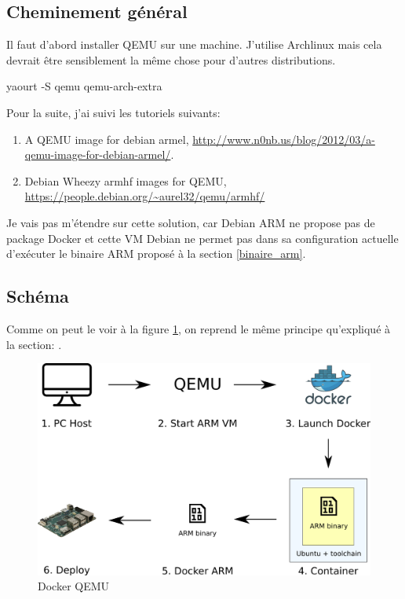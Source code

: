 \documentclass[11pt,a4paper,oneside]{report}
\begin{document}
\subsection{Cheminement général}

Il faut d'abord installer QEMU sur une machine. J'utilise Archlinux mais cela devrait être sensiblement la même chose pour d'autres distributions.

\label{install_qemu_arch}
\begin{bashcode}
yaourt -S qemu qemu-arch-extra
\end{bashcode}

Pour la suite, j'ai suivi les tutoriels suivants: 
\begin{enumerate}
\item A QEMU image for debian armel, \url{http://www.n0nb.us/blog/2012/03/a-qemu-image-for-debian-armel/}.
\item Debian Wheezy armhf images for QEMU, \url{https://people.debian.org/~aurel32/qemu/armhf/}
\end{enumerate}

Je vais pas m'étendre sur cette solution, car Debian ARM ne propose pas de package Docker et cette VM Debian ne permet pas dans sa configuration actuelle d'exécuter le binaire ARM proposé à la section \ref{binaire_arm}.

\subsection{Schéma}

Comme on peut le voir à la figure \ref{fig_docker_qemu}, on reprend le même principe qu'expliqué à la section: .

\begin{figure}[H]
    \begin{center}
        \includegraphics[scale=0.5]{img/docker_qemu}
    \end{center}
    \caption{Docker QEMU}
    \label{fig_docker_qemu}
\end{figure}
\end{document}
